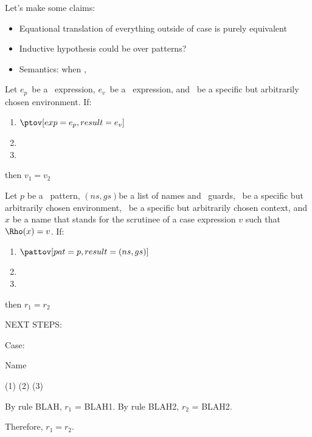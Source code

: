 \documentclass[]{article}
\begin{document}

Let's make some claims: 

\begin{itemize}
    \item Equational translation of everything outside of case is purely equivalent 
    \item Inductive hypothesis could be over patterns? 
    \item Semantics: when \prun, \vmrung
\end{itemize}

\newcommand\translatesto\rightsquigarrow

\newcommand\ep{\ensuremath{e_{p}}}
\newcommand\ev{\ensuremath{e_{v}}}
\newcommand\nsgs{\ensuremath{(ns, gs)}}


Let \ep\ be a \PPlus\ expression, \ev\ be a \VMinus\ expression, and \Rho\ be a
specific but arbitrarily chosen environment. If: 
\begin{enumerate}
    \item $\ptov[exp=\ep,result=\ev]$
    \item \prun[exp=\ep, value=v_{1}]
    \item \vmrung[guard=\ev, result=v_{2}]
\end{enumerate}

then $v_{1} = v_{2}$


Let $p$ be a \PPlus\ pattern, \nsgs be a list of names and \VMinus\ guards,
\Rho\ be a specific but arbitrarily chosen environment, \context\ be a specific
but arbitrarily chosen context, and $x$ be a name that stands for the scrutinee
of a case expression $v$ such that $\Rho(x) = v$. If: 
\begin{enumerate}
    \item $\pattov[pat=p, result=\nsgs]$
    \item \pmatch[newenv=r_{1}]
    \item \vmgs[envext={\bracketed{\forall n \in ns, n \mapsto
    \bot}},result=r_{2}] 
\end{enumerate}

then $r_{1} = r_{2}$

NEXT STEPS:


Case: 

Name 

(1) \pattov[pat=y, result={(y, [x = y])}] (2) \pmatch[pat=y, newenv=r_{1}] (3) \vmgs[envext=\bracketed{y \mapsto \rho(x)}, guards={[x = y]}, result=r_{2}]

By rule BLAH, $r_{1}$ = BLAH1. 
By rule BLAH2, $r_{2}$ = BLAH2. 

Therefore, $r_{1} = r_{2}$. 

\vmsemantics
\end{document}
